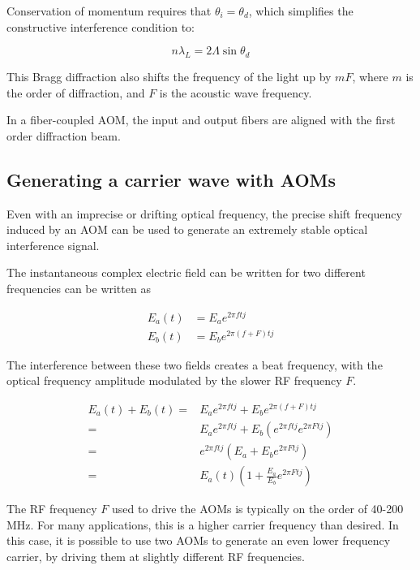 Conservation of momentum requires that $\theta_i = \theta_d$, which simplifies the constructive interference condition to:

\begin{equation}
n \lambda_L = 2 \Lambda \sin{\theta_d}
\end{equation}


This Bragg diffraction also shifts the frequency of the light up by $mF$, where $m$ is the order of diffraction, and $F$ is the acoustic wave frequency.

In a fiber-coupled AOM, the input and output fibers are aligned with the first order diffraction beam.

\subsection{Generating a carrier wave with AOMs}
\label{sec:aom_carrier}

Even with an imprecise or drifting optical frequency, the precise shift frequency induced by an AOM can be used to generate an extremely stable optical interference signal.

The instantaneous complex electric field can be written for two different frequencies can be written as

\begin{align}
E_a(t) & = E_a e^{2 \pi ft j} \\
E_b(t) & = E_b e^{2 \pi (f + F)t j}
\end{align}

The interference between these two fields creates a beat frequency, with the optical frequency amplitude modulated by the slower RF frequency $F$.

\begin{align}
E_a(t) + E_b(t) = & E_a e^{2 \pi ftj} + E_b e^{2 \pi (f + F)t j} \\
= & E_a e^{2 \pi ft j} + E_b (e^{2 \pi ftj} e^{2 \pi Ftj}) \\
= & e^{2 \pi ftj} (E_a + E_b e^{2 \pi Ftj}) \\
= & E_a(t) (1 + \frac{E_a}{E_b} e^{2 \pi Ftj})
\end{align}

The RF frequency $F$ used to drive the AOMs is typically on the order of 40-200 MHz. For many applications, this is a higher carrier frequency than desired. In this case, it is possible to use two AOMs to generate an even lower frequency carrier, by driving them at slightly different RF frequencies.

